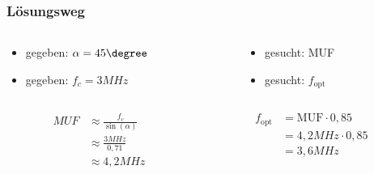 \begin{frame}
\frametitle{Lösungsweg}
\begin{columns}
    \begin{column}{0.48\textwidth}
    \begin{itemize}
  \item gegeben: $\alpha = 45\degree$
  \item gegeben: $f_c = 3MHz$
  \end{itemize}

    \end{column}
   \begin{column}{0.48\textwidth}
       \begin{itemize}
  \item gesucht: MUF
  \item gesucht: $f_{\textrm{opt}}$
  \end{itemize}

   \end{column}
\end{columns}
\begin{columns}
    \begin{column}{0.48\textwidth}
    
    \pause
    \begin{equation}\begin{split} \nonumber MUF &\approx \frac{f_c}{\sin(\alpha)}\\ &\approx \frac{3MHz}{0,71}\\ &\approx 4,2MHz \end{split}\end{equation}




    \end{column}
   \begin{column}{0.48\textwidth}
       
    \pause
    \begin{equation}\begin{split} \nonumber f_{\textrm{opt}} &= \textrm{MUF}\cdot 0,85\\ &= 4,2MHz \cdot 0,85\\ &= 3,6MHz \end{split}\end{equation}




   \end{column}
\end{columns}

\end{frame}

